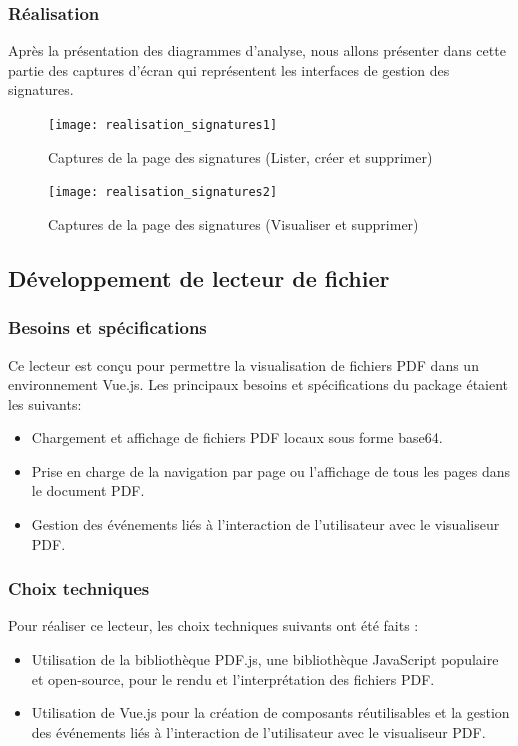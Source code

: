 \subsubsection{Réalisation}

Après la présentation des diagrammes d'analyse, nous allons présenter dans cette partie des captures d'écran qui représentent les interfaces de gestion des signatures.
\begin{figure}[H]
  \centering
  \texttt{[image: realisation\_signatures1]}
  \caption{Captures de la page des signatures (Lister, créer et supprimer)}
  \label{fig:realisation_signatures}
\end{figure}

\begin{figure}[H]
  \centering
  \texttt{[image: realisation\_signatures2]}
  \caption{Captures de la page des signatures (Visualiser et supprimer)}
  \label{fig:realisation_preview_delete_signature}
\end{figure}


\subsection{Développement de lecteur de fichier}
\subsubsection{Besoins et spécifications}
Ce lecteur est conçu pour permettre la visualisation de fichiers PDF dans un environnement Vue.js. Les principaux besoins et spécifications du package étaient les suivants:
\begin{itemize}
  \item Chargement et affichage de fichiers PDF locaux sous forme base64.
  \item Prise en charge de la navigation par page ou l'affichage de tous les pages dans le document PDF.
  \item Gestion des événements liés à l'interaction de l'utilisateur avec le visualiseur PDF.
\end{itemize}

\subsubsection{Choix techniques}
Pour réaliser ce lecteur, les choix techniques suivants ont été faits :
\begin{itemize}
  \item Utilisation de la bibliothèque PDF.js, une bibliothèque JavaScript populaire et open-source, pour le rendu et l'interprétation des fichiers PDF.
  \item Utilisation de Vue.js pour la création de composants réutilisables et la gestion des événements liés à l'interaction de l'utilisateur avec le visualiseur PDF.
\end{itemize}

